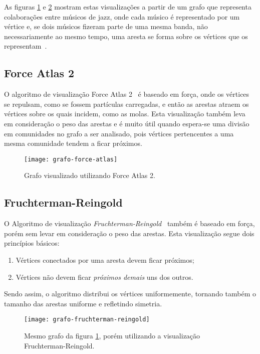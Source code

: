 As figuras \ref{fig:grafo-force-atlas} e \ref{fig:grafo-fruchterman-reingold} mostram estas visualizações a partir de um grafo que representa colaborações entre músicos de jazz, onde cada músico é representado por um vértice e, se dois músicos fizeram parte de uma mesma banda, não necessariamente ao mesmo tempo, uma aresta se forma sobre os vértices que os representam~\cite{gleiser2003list}.

\subsection{Force Atlas 2}
\label{conceitos__visualizacoes--force-atlas}

O algoritmo de visualização Force Atlas 2~\cite{jacomy2014forceatlas2} é baseado em força, onde os vértices se repulsam, como se fossem partículas carregadas, e então as arestas atraem os vértices sobre os quais incidem, como as molas. Esta visualização também leva em consideração o peso das arestas e é muito útil quando espera-se uma divisão em comunidades no grafo a ser analisado, pois vértices pertencentes a uma mesma comunidade tendem a ficar próximos.

\begin{figure}[H]
\texttt{[image: grafo-force-atlas]}
\centering
\caption{
    Grafo visualizado utilizando Force Atlas 2.
}
\label{fig:grafo-force-atlas}
\end{figure}

\subsection{Fruchterman-Reingold}
\label{conceitos__visualizacoes--fruchterman-reingold}

O Algoritmo de visualização \emph{Fruchterman-Reingold}~\cite{fruchterman1991graph} também é baseado em força, porém sem levar em consideração o peso das arestas. Esta visualização segue dois princípios básicos:

\begin{enumerate}
\item Vértices conectados por uma aresta devem ficar próximos;
\item Vértices não devem ficar \emph{próximos demais} uns dos outros.
\end{enumerate}

Sendo assim, o algoritmo distribui os vértices uniformemente, tornando também o tamanho das arestas uniforme e refletindo simetria.

\begin{figure}[H]
\texttt{[image: grafo-fruchterman-reingold]}
\centering
\caption{
    Mesmo grafo da figura \ref{fig:grafo-force-atlas}, porém utilizando a visualização Fruchterman-Reingold.
}
\label{fig:grafo-fruchterman-reingold}
\end{figure}

